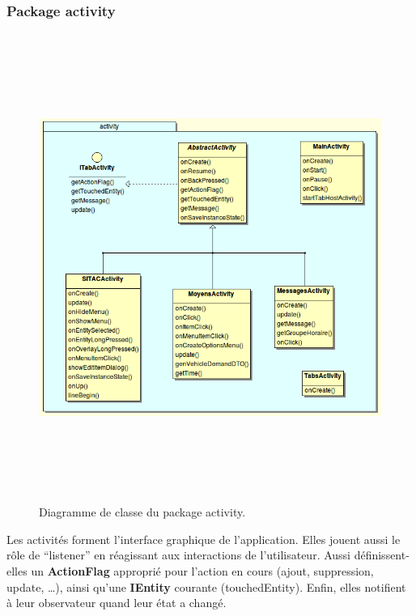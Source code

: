 \documentclass{article}
\begin{document}
\subsubsection{Package activity}
\begin{figure}[htbp]
\begin{center}
\includegraphics[height=433pt]{doc_dev-fig003.png}
\caption{Diagramme de classe du package activity.}
\end{center}
\end{figure}

Les activités forment l’interface graphique de l’application. Elles jouent aussi le rôle de “listener” en réagissant aux interactions de l’utilisateur. Aussi définissent-elles un \textbf{ActionFlag} approprié pour l’action en cours (ajout, suppression, update, …), ainsi qu’une \textbf{IEntity} courante (touchedEntity). Enfin, elles notifient à leur observateur quand leur état a changé.

\newpage
\end{document}
